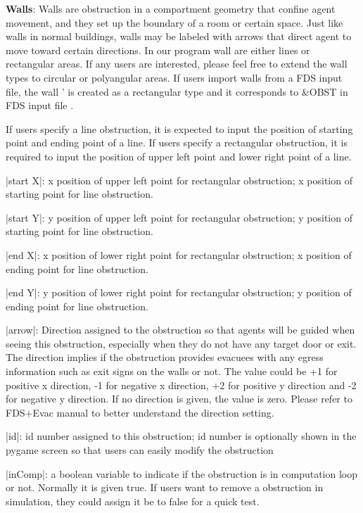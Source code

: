 \documentclass[english]{article}
\begin{document}
\textbf{Walls}: Walls are obstruction in a compartment geometry that
confine agent movement, and they set up the boundary of a room or
certain space. Just like walls in normal buildings, walls may be labeled
with arrows that direct agent to move toward certain directions. In
our program wall are either lines or rectangular areas. If any users
are interested, please feel free to extend the wall types to circular
or polyangular areas. If users import walls from a FDS input file,
the wall ' is created as a rectangular type and it corresponds to
\&OBST in FDS input file \cite{FDS_UserGuide}.

If users specify a line obstruction, it is expected to input the position
of starting point and ending point of a line. If users specify a rectangular
obstruction, it is required to input the position of upper left point
and lower right point of a line.

|start X|: x position of upper left point for rectangular obstruction;
x position of starting point for line obstruction.

|start Y|: y position of upper left point for rectangular obstruction;
y position of starting point for line obstruction.

|end X|: x position of lower right point for rectangular obstruction;
x position of ending point for line obstruction.

|end Y|: y position of lower right point for rectangular obstruction;
y position of ending point for line obstruction.

|arrow|: Direction assigned to the obstruction so that agents will
be guided when seeing this obstruction, especially when they do not
have any target door or exit. The direction implies if the obstruction
provides evacuees with any egress information such as exit signs on
the walls or not. The value could be +1 for positive x direction,
-1 for negative x direction, +2 for positive y direction and -2 for
negative y direction. If no direction is given, the value is zero.
Please refer to FDS+Evac manual to better understand the direction
setting.

|id|: id number assigned to this obstruction; id number is optionally
shown in the pygame screen so that users can easily modify the obstruction

|inComp|: a boolean variable to indicate if the obstruction is in
computation loop or not. Normally it is given true. If users want
to remove a obstruction in simulation, they could assign it be to
false for a quick test.
\end{document}
